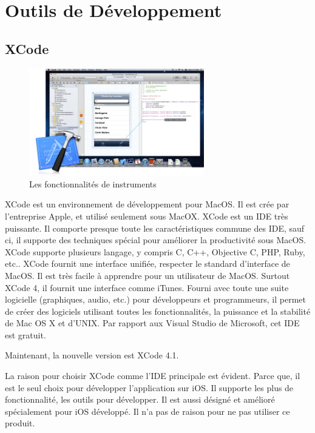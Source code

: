 
\section{Outils de Développement} %
\label{sec:outils_de_développement}

\subsection{XCode} %
\label{sub:xcode}

\begin{figure}[htbp]
	\centering
		\includegraphics[width=3in]{Image/tools_overview_xcode_20110711.jpg}
	\caption{Les fonctionnalités de instruments}
	\label{fig:Image_tools_overview_xcode_20110711}
\end{figure}

XCode est un environnement de développement pour MacOS. Il est crée par l'entreprise Apple, et utilisé seulement sous MacOX. XCode est un IDE très puissante. Il comporte presque toute les caractéristiques commune des IDE, sauf ci, il supporte des techniques spécial pour améliorer la productivité sous MacOS. XCode supporte plusieurs langage, y compris C, C++, Objective C, PHP, Ruby, etc.. XCode fournit une interface unifiée, respecter le standard d'interface de MacOS. Il est très facile à apprendre pour un utilisateur de MacOS. Surtout XCode 4, il fournit une interface comme iTunes. Fourni avec toute une suite logicielle (graphiques, audio, etc.) pour développeurs et programmeurs, il permet de créer des logiciels utilisant toutes les fonctionnalités, la puissance et la stabilité de Mac OS X et d'UNIX. Par rapport aux Visual Studio de Microsoft, cet IDE est gratuit.

Maintenant, la nouvelle version est XCode 4.1. 

La raison pour choisir XCode comme l'IDE principale est évident. Parce que, il est le seul choix pour développer l'application sur iOS. Il supporte les plus de fonctionnalité, les outils pour développer. Il est aussi désigné et amélioré spécialement pour iOS développé. Il n’a pas de raison pour ne pas utiliser ce produit.

